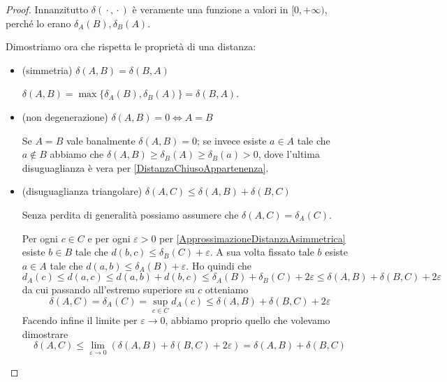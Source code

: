 \begin{proof}
	Innanzitutto $\delta({}\cdot{},{}\cdot{})$ è veramente una funzione a valori in $[0,+\infty)$, perché lo erano $\delta_A(B),\delta_B(A)$.

	Dimostriamo ora che rispetta le proprietà di una distanza:
	\begin{itemize}
		\item (simmetria) $\delta(A,B)=\delta(B,A)$
		
		$\delta(A,B)=\max\{ \delta_A(B),\delta_B(A) \}=\delta(B,A)$.
		\item (non degenerazione) $\delta(A,B)=0 \iff A=B$
		
		Se $A=B$ vale banalmente $\delta(A,B)=0$; se invece esiste $a\in A$ tale che $a\not\in B$ abbiamo che $\delta(A,B)\ge \delta_B(A)\ge \delta_B(a)>0$, dove l'ultima disuguaglianza è vera per \cref{DistanzaChiusoAppartenenza}.
		\item (disuguaglianza triangolare) $\delta(A,C)\le \delta(A,B)+\delta(B,C)$

		Senza perdita di generalità possiamo assumere che $\delta(A,C)=\delta_A(C)$. 

		Per ogni $c\in C$ e per ogni $\varepsilon>0$ per \cref{ApprossimazioneDistanzaAsimmetrica} esiste $b\in B$ tale che $d(b,c)\le \delta_B(C)+\varepsilon$. A sua volta fissato tale $b$ esiste $a\in A$ tale che $d(a,b)\le \delta_A(B)+\varepsilon$. Ho quindi che
		\begin{equation*}
			d_A(c)\le d(a,c)\le d(a,b)+d(b,c)\le \delta_A(B)+\delta_B(C)+2\varepsilon\le \delta(A,B)+\delta(B,C)+2\varepsilon
		\end{equation*}
		da cui passando all'estremo superiore su $c$ otteniamo
		\begin{equation*}
			\delta(A,C)=\delta_A(C)=\sup_{c\in C}d_A(c)\le \delta(A,B)+\delta(B,C)+2\varepsilon
		\end{equation*}
		Facendo infine il limite per $\varepsilon\to 0$, abbiamo proprio quello che volevamo dimostrare
		\begin{equation*}
			\delta(A,C)\le \lim_{\varepsilon\to 0}(\delta(A,B)+\delta(B,C)+2\varepsilon)=\delta(A,B)+\delta(B,C)
		\end{equation*}
	\end{itemize}
\end{proof}

